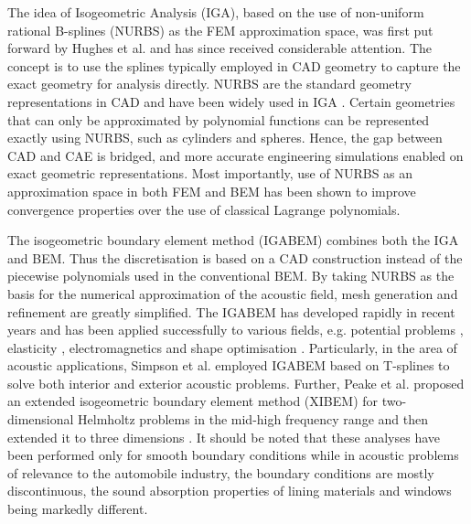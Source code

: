 \documentclass[review]{elsarticle}
\begin{document}
The idea of Isogeometric Analysis (IGA), based on the use of non-uniform rational B-splines (NURBS) as the FEM approximation space, was first put forward by Hughes et al. \cite{Hughes} and has since received considerable attention. The concept is to use the splines typically employed in CAD geometry to capture the exact geometry for analysis directly. NURBS are the standard geometry representations in CAD and have been widely used in IGA \cite{COOX2016441,HUGHES2014290,COTTRELL20074160,Cottrell,NGUYEN201589}. Certain geometries that can only be approximated by polynomial functions can be represented exactly using NURBS, such as cylinders and spheres. Hence, the gap between CAD and CAE is bridged, and more accurate engineering simulations enabled on exact geometric representations. Most importantly, use of NURBS as an approximation space in both FEM and BEM has been shown to improve convergence properties over the use of classical Lagrange polynomials.

The isogeometric boundary element method (IGABEM) combines both the IGA and BEM. Thus the discretisation is based on a CAD construction instead of the piecewise polynomials used in the conventional BEM. By taking NURBS as the basis for the numerical approximation of the acoustic field, mesh generation and refinement are greatly simplified. The IGABEM has developed rapidly in recent years \cite{Peake1, Li, Scott, Simpson2,BELIBASSAKIS201353,JonTrevelyan2018975} and has been applied successfully to various fields, e.g. potential problems \cite{Scott,Peake1,Peake2,Gong2017454,KEUCHEL2017488}, elasticity  \cite{Simpson2,BAI201554,Simpson2016168,PENG2017151}, electromagnetics \cite{SIMPSON2018264,dolz2018isogeometric} and shape optimisation \cite{KOSTAS2015611,GILLEBAART2016512,YOON2016119,LIAN20171}. Particularly, in the area of acoustic applications, Simpson et al. \cite{Simpson1} employed IGABEM based on T-splines to solve both interior and exterior acoustic problems. Further, Peake et al. proposed an extended isogeometric boundary element method (XIBEM) for two-dimensional Helmholtz problems in the mid-high frequency range \cite{Peake1} and then extended it to three dimensions \cite{Peake2}.  It should be noted that these analyses have been performed only for smooth boundary conditions while in acoustic problems of relevance to the automobile industry, the boundary conditions are mostly discontinuous, the sound absorption properties of lining materials and windows being markedly different. %
\end{document}

